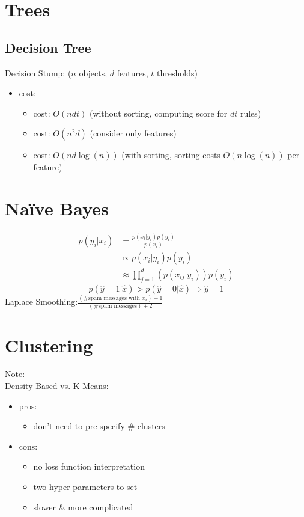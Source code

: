 \documentclass[10pt,landscape,a4paper]{article}
\begin{document}
\begin{multicols*}{5}
\section{Trees}

\subsection{Decision Tree}
Decision Stump: (\(n\) objects, \(d\) features, \(t\) thresholds)
\begin{itemize}
    \item cost:
    \begin{itemize}
        \item cost: \(O(ndt)\) (without sorting, computing score for \(dt\) rules)
        \item cost: \(O(n^2d)\) (consider only features)
        \item cost: \(O(nd \log(n))\) (with sorting, sorting costs \(O(n \log(n))\) per feature)
    \end{itemize}
\end{itemize}

\section{Naïve Bayes}
\begin{align*}
    p(y_i|x_i) &= \frac{p(x_i|y_i) p(y_i)}{p(x_i)} \\
    &\propto p(x_i|y_i) p(y_i) \\
    &\approx \prod_{j=1}^{d} (p(x_{ij}|y_i)) p(y_i)
\end{align*}
\begin{equation*}
    p(\hat{y} = 1|\hat{x}) > p(\hat{y}=0|\hat{x}) \Rightarrow \hat{y} = 1
\end{equation*}
Laplace Smoothing:\(\frac{(\text{\# spam messages with } x_i)+1}{(\text{\# spam messages})+2}\)

\section{Clustering}

Note: \\
Density-Based vs. K-Means:
\begin{itemize}
    \item pros:
    \begin{itemize}
        \item don't need to pre-specify \# clusters
    \end{itemize}
    \item cons:
    \begin{itemize}
        \item no loss function interpretation
        \item two hyper parameters to set
        \item slower \& more complicated
    \end{itemize}
\end{itemize}


\end{multicols*}
\end{document}
